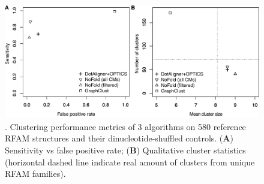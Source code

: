 \documentclass{bmcart}
\begin{document}
\begin{backmatter}
\begin{figure}[h!]
 \includegraphics[width=\textwidth]{fig4}
 \caption {. Clustering performance metrics of 3 algorithms on 580 reference RFAM 
 structures and their dinucleotide-shuffled controls. (\textbf{A}) Sensitivity vs false positive rate; (\textbf{B}) Qualitative cluster statistics (horizontal dashed line indicate real amount of clusters from unique RFAM families). }
\end{figure}



\end{backmatter}
\end{document}

